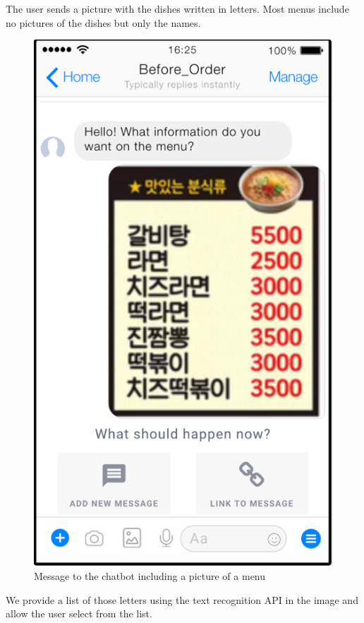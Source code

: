 The user sends a picture with the dishes written in letters. Most menus include no pictures of the dishes but only the names.

\begin{figure}[htbp]
\centerline{\includegraphics[width=\linewidth]{./pictures/facebook_menu}}
\caption{Message to the chatbot including a picture of a menu}
\label{fig:facebook_menu}
\end{figure}
\FloatBarrier

We provide a list of those letters using the text recognition API in the image and allow the user select from the list.

